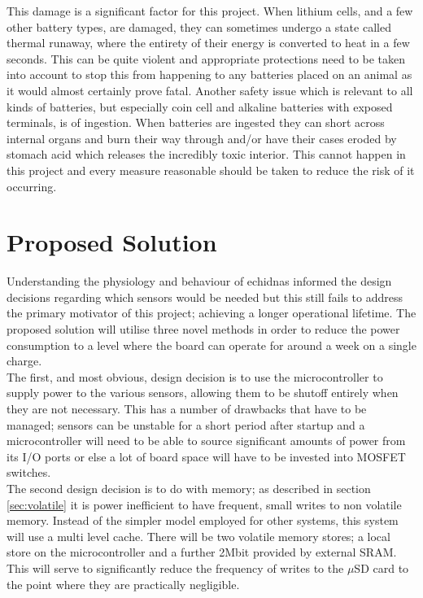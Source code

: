 \documentclass[12pt,openany,a4paper]{book}
\begin{document}
			This damage is a significant factor for this project. When lithium cells, and a few other battery types, are damaged, they can sometimes undergo a state called thermal runaway, where the entirety of their energy is converted to heat in a few seconds. This can be quite violent and appropriate protections need to be taken into account to stop this from happening to any batteries placed on an animal as it would almost certainly prove fatal. Another safety issue which is relevant to all kinds of batteries, but especially coin cell and alkaline batteries with exposed terminals, is of ingestion. When batteries are ingested they can short across internal organs and burn their way through and/or have their cases eroded by stomach acid which releases the incredibly toxic interior. This cannot happen in this project and every measure reasonable should be taken to reduce the risk of it occurring.
			
		\section{Proposed Solution}
		Understanding the physiology and behaviour of echidnas informed the design decisions regarding which sensors would be needed but this still fails to address the primary motivator of this project; achieving a longer operational lifetime. The proposed solution will utilise three novel methods in order to reduce the power consumption to a level where the board can operate for around a week on a single charge. \\
		
		The first, and most obvious, design decision is to use the microcontroller to supply power to the various sensors, allowing them to be shutoff entirely when they are not necessary. This has a number of drawbacks that have to be managed; sensors can be unstable for a short period after startup and a microcontroller will need to be able to source significant amounts of power from its I/O ports or else a lot of board space will have to be invested into MOSFET switches. \\
		
		The second design decision is to do with memory; as described in section \ref{sec:volatile} it is power inefficient to have frequent, small writes to non volatile memory. Instead of the simpler model employed for other systems, this system will use a multi level cache. There will be two volatile memory stores; a local store on the microcontroller and a further 2Mbit provided by external SRAM. This will serve to significantly reduce the frequency of writes to the $\mu$SD card to the point where they are practically negligible. \\
		
\end{document}
